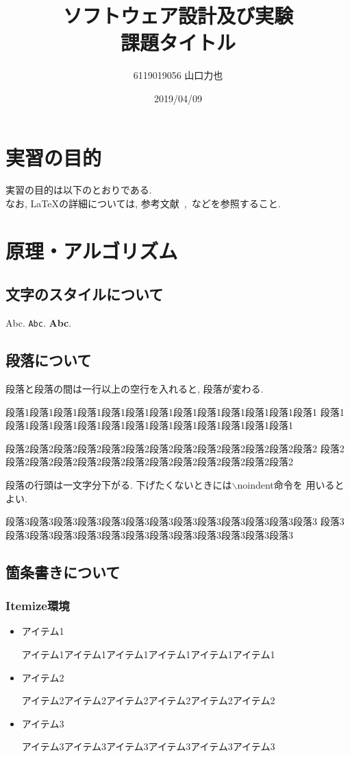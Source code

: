 \documentclass{jarticle}
\title{ソフトウェア設計及び実験\\課題タイトル}
\author{6119019056 山口力也}
\date{2019/04/09}
\begin{document}
\maketitle

\section{実習の目的}
%
実習の目的は以下のとおりである.\\
なお, {\LaTeX}の詳細については, 参考文献~\cite{okumura},~\cite{matsuda}などを参照すること. 

\section{原理・アルゴリズム}
%
\subsection{文字のスタイルについて}
%
Abc. \texttt{Abc}. \textbf{Abc}. 

\subsection{段落について}

段落と段落の間は一行以上の空行を入れると, 段落が変わる. 

段落1段落1段落1段落1段落1段落1段落1段落1段落1段落1段落1段落1段落1
段落1段落1段落1段落1段落1段落1段落1段落1段落1段落1段落1段落1段落1

段落2段落2段落2段落2段落2段落2段落2段落2段落2段落2段落2段落2段落2
段落2段落2段落2段落2段落2段落2段落2段落2段落2段落2段落2段落2段落2

段落の行頭は一文字分下がる. 下げたくないときには$\backslash$noindent命令を
用いるとよい. 

\noindent
段落3段落3段落3段落3段落3段落3段落3段落3段落3段落3段落3段落3段落3
段落3段落3段落3段落3段落3段落3段落3段落3段落3段落3段落3段落3段落3

\subsection{箇条書きについて}
%
\subsubsection{Itemize環境}

\begin{itemize}
\item アイテム1

アイテム1アイテム1アイテム1アイテム1アイテム1アイテム1

\item アイテム2

アイテム2アイテム2アイテム2アイテム2アイテム2アイテム2

\item アイテム3

アイテム3アイテム3アイテム3アイテム3アイテム3アイテム3
\end{itemize}
\end{document}
